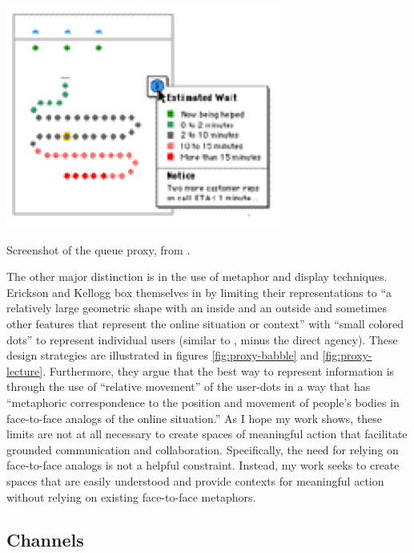 \documentclass{tufte-handout}
\begin{document}



\begin{marginfigure}
	\includegraphics{figures/queue.png}
	\caption{Screenshot of the queue proxy, from \citep{Erickson:2003td}.}
	\label{fig:proxy-queue}
\end{marginfigure}

The other major distinction is in the use of metaphor and display techniques. Erickson and Kellogg box themselves in by limiting their representations to ``a relatively large geometric shape with an inside and an outside and sometimes other features that represent the online situation or context'' \citep{Erickson:2003td} with ``small colored dots'' to represent individual users (similar to \citep{Viegas:1999kv}, minus the direct agency). These design strategies are illustrated in figures \ref{fig:proxy-babble} and \ref{fig:proxy-lecture}. Furthermore, they argue that the best way to represent information is through the use of ``relative movement'' of the user-dots in a way that has ``metaphoric correspondence to the position and movement of people's bodies in face-to-face analogs of the online situation.'' \citep{Erickson:2003td} As I hope my work shows, these limits are not at all necessary to create spaces of meaningful action that facilitate grounded communication and collaboration. Specifically, the need for relying on face-to-face analogs is not a helpful constraint. Instead, my work seeks to create spaces that are easily understood and provide contexts for meaningful action without relying on existing face-to-face metaphors.



\subsection{Channels}
\end{document}
